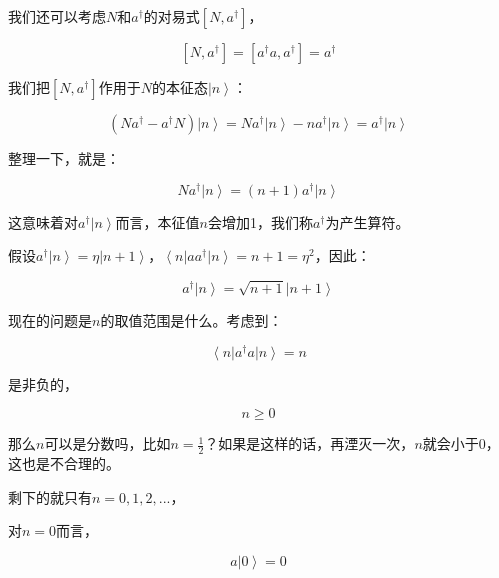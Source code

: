 我们还可以考虑$N$和$a^\dagger$的对易式$\left[ N, a^\dagger \right]$，

\begin{equation}
\left[ N, a^\dagger \right] = \left[ a^\dagger a , a^\dagger \right] = a^\dagger~
\end{equation}

我们把$\left[ N, a^\dagger \right] $作用于$N$的本征态$\left| n \right\rangle$：

\begin{equation}
\left( N a^\dagger - a^\dagger N \right) \left| n \right\rangle =   N a^\dagger \left| n \right\rangle - n a^\dagger \left| n \right\rangle = a^\dagger \left| n \right\rangle~
\end{equation}

整理一下，就是：

\begin{equation}
N a^\dagger \left| n \right\rangle = (n +1) a^\dagger \left| n \right\rangle~
\end{equation}

这意味着对$a^\dagger \left| n \right\rangle$而言，本征值$n$会增加1，我们称$a^\dagger$为产生算符。

假设$a^\dagger \left| n \right\rangle = \eta \left| n+1 \right\rangle$，$\left\langle n \right| a a^\dagger \left| n \right\rangle = n + 1 = \eta^2 $，因此：

\begin{equation}
a^\dagger \left| n \right\rangle = \sqrt{n + 1} \left| n+1 \right\rangle~
\end{equation}

现在的问题是$n$的取值范围是什么。考虑到：

\begin{equation}
\left\langle n \right| a^\dagger a \left| n \right\rangle = n~
\end{equation}

是非负的，

\begin{equation}
n \ge 0~
\end{equation}

那么$n$可以是分数吗，比如$n = \frac{1}{2}$？如果是这样的话，再湮灭一次，$n$就会小于0，这也是不合理的。

剩下的就只有$n = 0, 1, 2, ...$，

对$n = 0$而言，

\begin{equation}
a \left| 0 \right\rangle = 0~
\end{equation}

